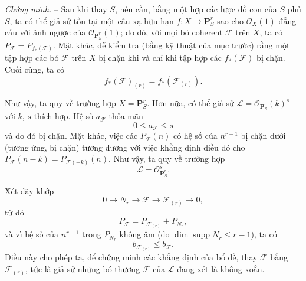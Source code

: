 \documentclass[11pt,twoside,openany]{book}
\numberwithin{equation}{section}
\newcommand{\src}[1]{%
  \phantomsection\hypertarget{src:\fgasourceid:#1}{}%
  \marginpar{\raggedleft\footnotesize\sffamily #1}%
}
\newcommand{\fgasourceid}{unset}
\begin{document}
\emph{Chứng minh.} -- Sau khi thay $S$, nếu cần, bằng một hợp các lược đồ con
của $S$ phủ $S$, ta có thể giả sử tồn tại một cấu xạ hữu hạn
$f:X\longrightarrow\mathbf P^r_S$ sao cho $\mathcal O_X(1)$ đẳng cấu với ảnh
ngược của $\mathcal O_{\mathbf P^r_S}(1)$; do đó, với mọi bó coherent
$\mathcal F$ trên $X$, ta có
$P_{\mathcal F}=P_{f_*(\mathcal F)}$. Mặt khác, dễ kiểm tra (bằng kỹ thuật của
mục trước) rằng một tập hợp các bó $\mathcal F$ trên $X$ bị chặn khi và chỉ khi
tập hợp các $f_*(\mathcal F)$ bị chặn. Cuối cùng, ta có
\[
f_*(\mathcal F)_{(r)}=f_*(\mathcal F_{(r)}).
\]
\src{256}
Như vậy, ta quy về trường hợp $X=\mathbf P^r_S$. Hơn nữa, có thể giả sử
$\mathcal L=\mathcal O_{\mathbf P^r_S}(k)^s$ với $k$, $s$ thích hợp. Hệ số
$a_{\mathcal F}$ thỏa mãn
\[
0\leq a_{\mathcal F}\leq s
\]
và do đó bị chặn. Mặt khác, việc các $P_{\mathcal F}(n)$ có hệ số của
$n^{r-1}$ bị chặn dưới (tương ứng, bị chặn) tương đương với việc khẳng định
điều đó cho
$P_{\mathcal F}(n-k)=P_{\mathcal F(-k)}(n)$. Như vậy, ta quy về trường hợp
\[
\mathcal L=\mathcal O_{\mathbf P^r_S}^{s}.
\]

Xét dãy khớp
\[
0\longrightarrow N_r\longrightarrow\mathcal F
\longrightarrow\mathcal F_{(r)}\longrightarrow0,
\]
từ đó
\[
P_{\mathcal F}=P_{\mathcal F_{(r)}}+P_{N_r},
\]
và vì hệ số của $n^{r-1}$ trong $P_{N_r}$ không âm (do
$\dim\operatorname{supp}N_r\leq r-1$), ta có
\[
b_{\mathcal F_{(r)}}\leq b_{\mathcal F}.
\]
Điều này cho phép ta, để chứng minh các khẳng định của bổ đề, thay
$\mathcal F$ bằng $\mathcal F_{(r)}$, tức là giả sử những bó thương
$\mathcal F$ của $\mathcal L$ đang xét là không xoắn.
\end{document}
